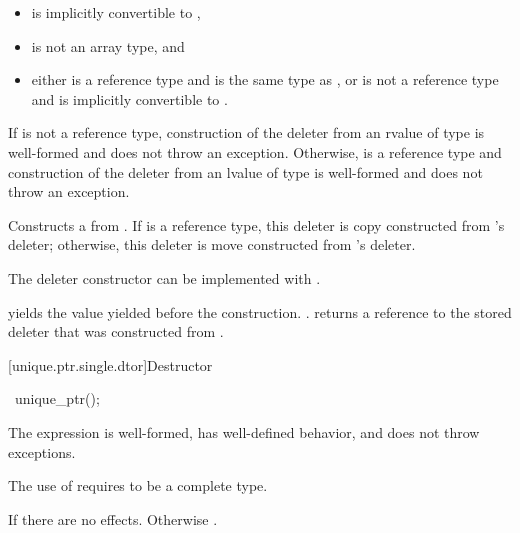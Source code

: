 \begin{itemdescr}
\pnum
\constraints
\begin{itemize}
\item {} is implicitly convertible to ,
\item {} is not an array type, and
\item either  is a reference type and  is the same type as , or
 is not a reference type and  is implicitly convertible to .
\end{itemize}

\pnum
\expects
If  is not a reference type,
construction of the deleter from an rvalue of type 
is well-formed and does not throw an exception.
Otherwise,  is a reference type and
construction of the deleter from an lvalue of type 
is well-formed and does not throw an exception.

\pnum
\effects
Constructs a  from .
If  is a reference type, this deleter is copy constructed from
's deleter; otherwise, this deleter is move constructed from 's
deleter.
\begin{note}
The deleter constructor can be implemented with
.
\end{note}

\pnum
\ensures
{} yields the value 
yielded before the construction. .
 returns a reference
to the stored deleter that was constructed from
.
\end{itemdescr}

[unique.ptr.single.dtor]{Destructor}

%
\begin{itemdecl}
~unique_ptr();
\end{itemdecl}

\begin{itemdescr}
\pnum
\expects
The expression  is well-formed,
has well-defined behavior, and does not throw exceptions.
\begin{note}
The use of  requires  to be a complete type.
\end{note}

\pnum
\effects
If  there are no effects.
Otherwise .
\end{itemdescr}

